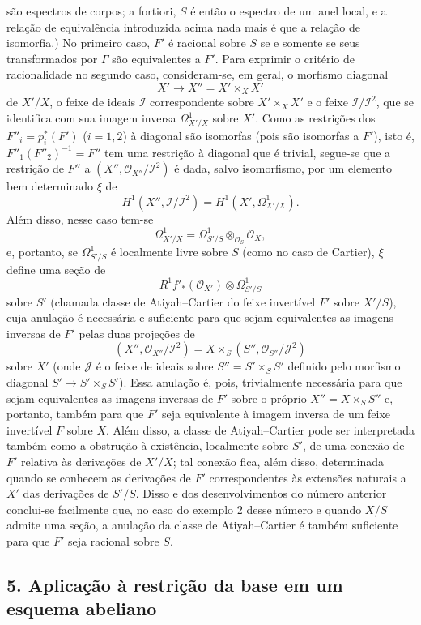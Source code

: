 \documentclass[11pt,twoside,openany]{book}
\numberwithin{equation}{section}
\newcommand{\src}[1]{%
  \phantomsection\hypertarget{src:#1}{}%
  \marginpar{\raggedleft\footnotesize\sffamily #1}%
}
\theoremstyle{plain}
\theoremstyle{definition}
\theoremstyle{remark}
\newcommand{\FgaUnitKey}{frontmatter}
\renewcommand{\src}[1]{%
  \phantomsection\hypertarget{src:\FgaUnitKey:#1}{}%
  \marginpar{\raggedleft\footnotesize\sffamily #1}%
}
\begin{document}
\src{323}
são espectros de corpos; a fortiori, $S$ é então o espectro de um anel
local, e a relação de equivalência introduzida acima nada mais é que a relação
de isomorfia.) No primeiro caso, $F'$ é racional sobre $S$ se e somente se seus
transformados por $\Gamma$ são equivalentes a $F'$. Para exprimir o critério
de racionalidade no segundo caso, consideram-se, em geral, o morfismo
diagonal
\[
  X'\longrightarrow X''=X'\times_XX'
\]
de $X'/X$, o feixe de ideais $\mathcal I$ correspondente sobre
$X'\times_XX'$ e o feixe $\mathcal I/\mathcal I^2$, que se identifica com sua
imagem inversa $\Omega^1_{X'/X}$ sobre $X'$. Como as restrições dos
$F''_i=p_i^*(F')$ ($i=1,2$) à diagonal são isomorfas (pois são isomorfas a
$F'$), isto é, $F''_1(F''_2)^{-1}=F''$ tem uma restrição à diagonal
que é trivial, segue-se que a restrição de $F''$ a
$(X'',\mathcal O_{X''}/\mathcal I^2)$ é dada, salvo isomorfismo, por um
elemento bem determinado $\xi$ de
\[
  H^1(X'',\mathcal I/\mathcal I^2)
  =H^1(X',\Omega^1_{X'/X}).
\]
Além disso, nesse caso tem-se
\[
  \Omega^1_{X'/X}
  =\Omega^1_{S'/S}\otimes_{\mathcal O_S}\mathcal O_X,
\]
e, portanto, se $\Omega^1_{S'/S}$ é localmente livre sobre $S$ (como no
caso de Cartier), $\xi$ define uma seção de
\[
  R^1f'_*(\mathcal O_{X'})\otimes\Omega^1_{S'/S}
\]
sobre $S'$ (chamada classe de Atiyah--Cartier do feixe invertível $F'$ sobre
$X'/S$), cuja anulação é necessária e suficiente para que sejam equivalentes
as imagens inversas de $F'$ pelas duas projeções de
\[
  (X'',\mathcal O_{X''}/\mathcal I^2)
  =X\times_S(S'',\mathcal O_{S''}/\mathcal J^2)
\]
sobre $X'$ (onde $\mathcal J$ é o feixe de ideais sobre
$S''=S'\times_SS'$ definido pelo morfismo diagonal
$S'\longrightarrow S'\times_SS'$). Essa anulação é, pois, trivialmente
necessária para que sejam equivalentes as imagens inversas de $F'$ sobre o
próprio $X''=X\times_SS''$ e, portanto, também para que $F'$ seja equivalente
à imagem inversa de um feixe invertível $F$ sobre $X$. Além disso, a classe de
Atiyah--Cartier pode ser interpretada também como a obstrução à existência,
localmente sobre $S'$, de uma conexão de $F'$ relativa às derivações de
$X'/X$; tal conexão fica, além disso, determinada quando se conhecem as
derivações de $F'$ correspondentes às extensões naturais a $X'$ das
derivações de $S'/S$. Disso e dos desenvolvimentos do número anterior
conclui-se facilmente que, no caso do exemplo 2 desse número e quando $X/S$
admite uma seção, a anulação da classe de Atiyah--Cartier é também
suficiente para que $F'$ seja racional sobre $S$.

\subsection*{5. Aplicação à restrição da base em um esquema abeliano}
\end{document}
